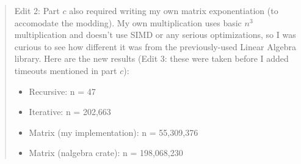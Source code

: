 \documentclass[11pt]{article}
\begin{document}
\begin{enumerate}[leftmargin=*]
\begin{enumerate}
\begin{quote}
  \medskip
  Edit 2: Part $c$ also required writing my own matrix exponentiation (to accomodate the modding). My own multiplication uses basic $n^3$ multiplication and doesn't use SIMD or any serious optimizations, so I was curious to see how different it was from the previously-used Linear Algebra library. Here are the new results (Edit 3: these were taken before I added timeouts mentioned in part $c$): 
  \begin{itemize}
    \item Recursive: n = 47
    \item Iterative: n = 202,663
    \item Matrix (my implementation): n = 55,309,376
    \item Matrix (nalgebra crate): n = 198,068,230
  \end{itemize}


\end{quote}
\end{enumerate}
\end{enumerate}
\end{document}
